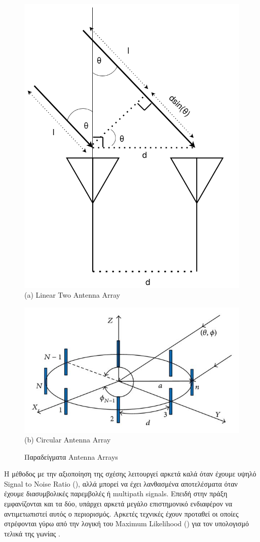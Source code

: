 \begin{figure} [H]
	\centering
    \begin{minipage}{.5\textwidth}
      \centering
      \includegraphics[width=0.5\linewidth]{../Photos/aoa-2antennas.png}\\
      {(a) Linear Two Antenna Array}
    \end{minipage}%
    \begin{minipage}{.5\textwidth}
      \centering
      \includegraphics[width=.7\linewidth]{../Images/Theoretical-Background/The-antenna-array-geometry-a-linear-and-b-circular_W640.jpeg}\\
      {(b) Circular Antenna Array }
	\end{minipage}
    \hfill \break
    \decoRule
    \caption[Παραδείγματα Antenna Arrays]{Παραδείγματα Antenna Arrays} %
    \label{fig:Antenna-Arrays}
\end{figure}

Η μέθοδος με την αξιοποίηση της σχέσης  λειτουργεί αρκετά καλά όταν έχουμε υψηλό Signal to Noise Ratio (),
αλλά μπορεί να έχει λανθασμένα αποτελέσματα όταν έχουμε διασυμβολικές παρεμβολές ή multipath signals. 
Επειδή στην πράξη εμφα\-νί\-ζονται και τα δύο, υπάρχει αρκετά μεγάλο επιστημονικό ενδιαφέρον να αντι\-με\-τω\-πι\-στεί αυτός ο περιορισμός.
Αρκετές τεχνικές έχουν προταθεί οι οποίες στρέφονται γύρω από την λογική του Maximum Likelihood ()
για τον υπολογισμό τελικά της γωνίας \cite{wsn-Localization-techniques}.

